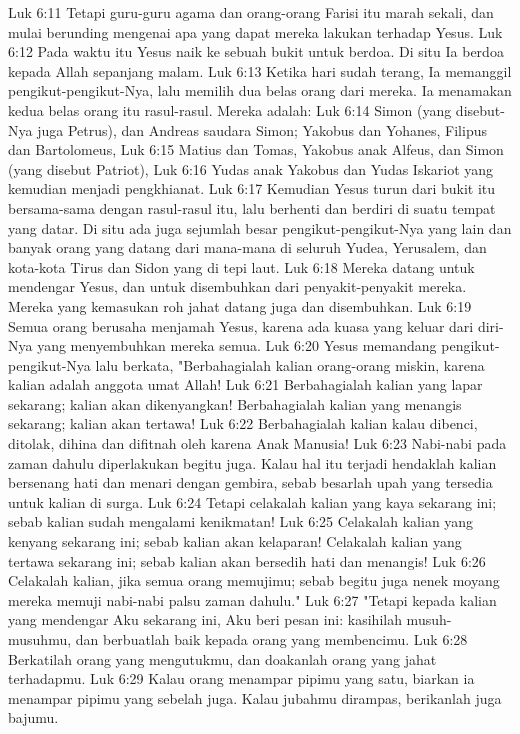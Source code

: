 Luk 6:11  Tetapi guru-guru agama dan orang-orang Farisi itu marah sekali, dan mulai berunding mengenai apa yang dapat mereka lakukan terhadap Yesus.
Luk 6:12  Pada waktu itu Yesus naik ke sebuah bukit untuk berdoa. Di situ Ia berdoa kepada Allah sepanjang malam.
Luk 6:13  Ketika hari sudah terang, Ia memanggil pengikut-pengikut-Nya, lalu memilih dua belas orang dari mereka. Ia menamakan kedua belas orang itu rasul-rasul. Mereka adalah:
Luk 6:14  Simon (yang disebut-Nya juga Petrus), dan Andreas saudara Simon; Yakobus dan Yohanes, Filipus dan Bartolomeus,
Luk 6:15  Matius dan Tomas, Yakobus anak Alfeus, dan Simon (yang disebut Patriot),
Luk 6:16  Yudas anak Yakobus dan Yudas Iskariot yang kemudian menjadi pengkhianat.
Luk 6:17  Kemudian Yesus turun dari bukit itu bersama-sama dengan rasul-rasul itu, lalu berhenti dan berdiri di suatu tempat yang datar. Di situ ada juga sejumlah besar pengikut-pengikut-Nya yang lain dan banyak orang yang datang dari mana-mana di seluruh Yudea, Yerusalem, dan kota-kota Tirus dan Sidon yang di tepi laut.
Luk 6:18  Mereka datang untuk mendengar Yesus, dan untuk disembuhkan dari penyakit-penyakit mereka. Mereka yang kemasukan roh jahat datang juga dan disembuhkan.
Luk 6:19  Semua orang berusaha menjamah Yesus, karena ada kuasa yang keluar dari diri-Nya yang menyembuhkan mereka semua.
Luk 6:20  Yesus memandang pengikut-pengikut-Nya lalu berkata, "Berbahagialah kalian orang-orang miskin, karena kalian adalah anggota umat Allah!
Luk 6:21  Berbahagialah kalian yang lapar sekarang; kalian akan dikenyangkan! Berbahagialah kalian yang menangis sekarang; kalian akan tertawa!
Luk 6:22  Berbahagialah kalian kalau dibenci, ditolak, dihina dan difitnah oleh karena Anak Manusia!
Luk 6:23  Nabi-nabi pada zaman dahulu diperlakukan begitu juga. Kalau hal itu terjadi hendaklah kalian bersenang hati dan menari dengan gembira, sebab besarlah upah yang tersedia untuk kalian di surga.
Luk 6:24  Tetapi celakalah kalian yang kaya sekarang ini; sebab kalian sudah mengalami kenikmatan!
Luk 6:25  Celakalah kalian yang kenyang sekarang ini; sebab kalian akan kelaparan! Celakalah kalian yang tertawa sekarang ini; sebab kalian akan bersedih hati dan menangis!
Luk 6:26  Celakalah kalian, jika semua orang memujimu; sebab begitu juga nenek moyang mereka memuji nabi-nabi palsu zaman dahulu."
Luk 6:27  "Tetapi kepada kalian yang mendengar Aku sekarang ini, Aku beri pesan ini: kasihilah musuh-musuhmu, dan berbuatlah baik kepada orang yang membencimu.
Luk 6:28  Berkatilah orang yang mengutukmu, dan doakanlah orang yang jahat terhadapmu.
Luk 6:29  Kalau orang menampar pipimu yang satu, biarkan ia menampar pipimu yang sebelah juga. Kalau jubahmu dirampas, berikanlah juga bajumu.
